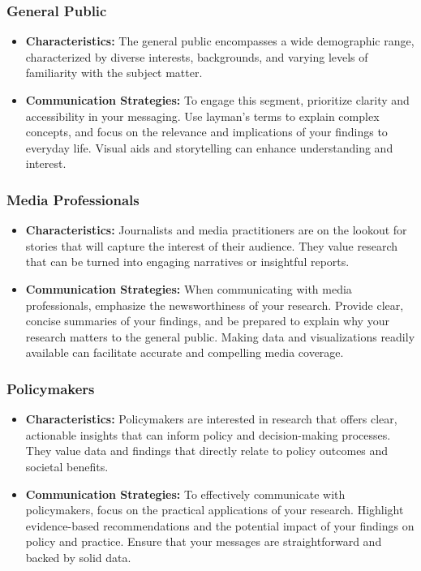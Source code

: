\documentclass[
]{book}
\providecommand{\tightlist}{%
  \setlength{\itemsep}{0pt}\setlength{\parskip}{0pt}}
\begin{document}
\hypertarget{general-public}{%
\subsubsection{General Public}\label{general-public}}

\begin{itemize}
\tightlist
\item
  \textbf{Characteristics:} The general public encompasses a wide demographic range, characterized by diverse interests, backgrounds, and varying levels of familiarity with the subject matter.
\item
  \textbf{Communication Strategies:} To engage this segment, prioritize clarity and accessibility in your messaging. Use layman's terms to explain complex concepts, and focus on the relevance and implications of your findings to everyday life. Visual aids and storytelling can enhance understanding and interest.
\end{itemize}

\hypertarget{media-professionals}{%
\subsubsection{Media Professionals}\label{media-professionals}}

\begin{itemize}
\tightlist
\item
  \textbf{Characteristics:} Journalists and media practitioners are on the lookout for stories that will capture the interest of their audience. They value research that can be turned into engaging narratives or insightful reports.
\item
  \textbf{Communication Strategies:} When communicating with media professionals, emphasize the newsworthiness of your research. Provide clear, concise summaries of your findings, and be prepared to explain why your research matters to the general public. Making data and visualizations readily available can facilitate accurate and compelling media coverage.
\end{itemize}

\hypertarget{policymakers}{%
\subsubsection{Policymakers}\label{policymakers}}

\begin{itemize}
\tightlist
\item
  \textbf{Characteristics:} Policymakers are interested in research that offers clear, actionable insights that can inform policy and decision-making processes. They value data and findings that directly relate to policy outcomes and societal benefits.
\item
  \textbf{Communication Strategies:} To effectively communicate with policymakers, focus on the practical applications of your research. Highlight evidence-based recommendations and the potential impact of your findings on policy and practice. Ensure that your messages are straightforward and backed by solid data.
\end{itemize}
\end{document}
